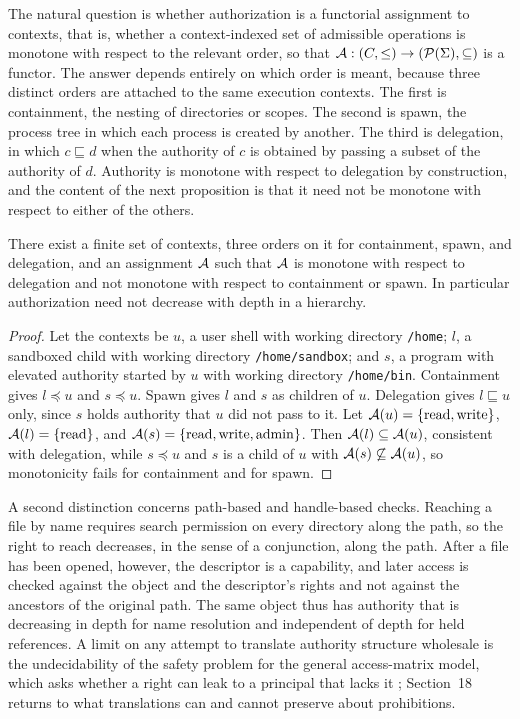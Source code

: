 The natural question is whether authorization is a functorial assignment to contexts, that is, whether a context-indexed set of admissible operations is monotone with respect to the relevant order, so that $\mathcal A:(C,\le)\to(\mathcal P(\Sigma),\subseteq)$ is a functor. The answer depends entirely on which order is meant, because three distinct orders are attached to the same execution contexts. The first is containment, the nesting of directories or scopes. The second is spawn, the process tree in which each process is created by another. The third is delegation, in which $c\sqsubseteq d$ when the authority of $c$ is obtained by passing a subset of the authority of $d$. Authority is monotone with respect to delegation by construction, and the content of the next proposition is that it need not be monotone with respect to either of the others.

\begin{proposition}\label{prop:authorders}
There exist a finite set of contexts, three orders on it for containment, spawn, and delegation, and an assignment $\mathcal A$ such that $\mathcal A$ is monotone with respect to delegation and not monotone with respect to containment or spawn. In particular authorization need not decrease with depth in a hierarchy.
\end{proposition}
\begin{proof}
Let the contexts be $u$, a user shell with working directory \texttt{/home}; $l$, a sandboxed child with working directory \texttt{/home/sandbox}; and $s$, a program with elevated authority started by $u$ with working directory \texttt{/home/bin}. Containment gives $l\preceq u$ and $s\preceq u$. Spawn gives $l$ and $s$ as children of $u$. Delegation gives $l\sqsubseteq u$ only, since $s$ holds authority that $u$ did not pass to it. Let $\mathcal A(u)=\{\mathrm{read},\mathrm{write}\}$, $\mathcal A(l)=\{\mathrm{read}\}$, and $\mathcal A(s)=\{\mathrm{read},\mathrm{write},\mathrm{admin}\}$. Then $\mathcal A(l)\subseteq\mathcal A(u)$, consistent with delegation, while $s\preceq u$ and $s$ is a child of $u$ with $\mathcal A(s)\not\subseteq\mathcal A(u)$, so monotonicity fails for containment and for spawn.
\end{proof}

A second distinction concerns path-based and handle-based checks. Reaching a file by name requires search permission on every directory along the path, so the right to reach decreases, in the sense of a conjunction, along the path. After a file has been opened, however, the descriptor is a capability, and later access is checked against the object and the descriptor's rights and not against the ancestors of the original path. The same object thus has authority that is decreasing in depth for name resolution and independent of depth for held references. A limit on any attempt to translate authority structure wholesale is the undecidability of the safety problem for the general access-matrix model, which asks whether a right can leak to a principal that lacks it \cite{hru}; Section~18 returns to what translations can and cannot preserve about prohibitions.

